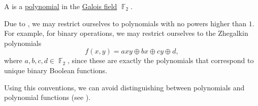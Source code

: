 \begin{definition}\label{def:zhegalkin_polynomial}
  A  is a \hyperref[def:polynomial]{polynomial} in the \hyperref[thm:galois_field_existence]{Galois field} \( \BbbF_2 \).

  Due to , we may restrict ourselves to polynomials with no powers higher than \( 1 \). For example, for binary operations, we may restrict ourselves to the Zhegalkin polynomials
  \begin{equation}\label{eq:def:zhegalkin_polynomial/binary_polynomial}
    f(x, y) = axy \oplus bx \oplus cy \oplus d,
  \end{equation}
  where \( a, b, c, d \in \BbbF_2 \), since these are exactly the polynomials that correspond to unique binary Boolean functions.

  Using this conventions, we can avoid distinguishing between polynomials and polynomial functions (see ).
\end{definition}

